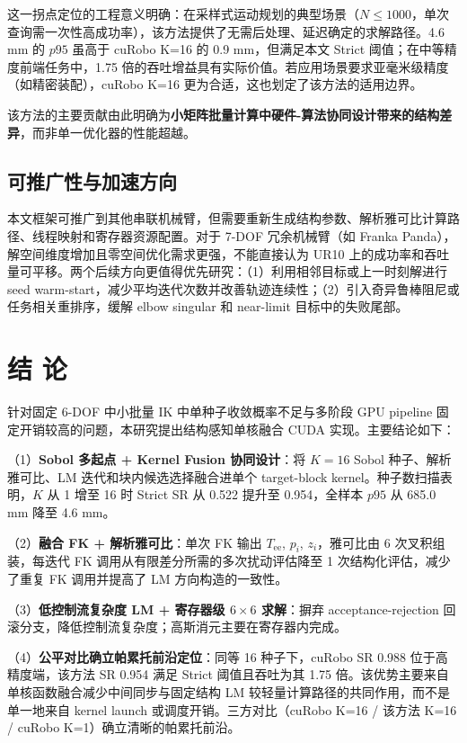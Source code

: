 \documentclass[twocolumn,a4paper,10pt]{ctexart}
\begin{document}
这一拐点定位的工程意义明确：在采样式运动规划的典型场景（$N\le1000$，单次查询需一次性高成功率），该方法提供了无需后处理、延迟确定的求解路径。4.6 mm 的 $p95$ 虽高于 cuRobo K=16 的 0.9 mm，但满足本文 Strict 阈值；在中等精度前端任务中，1.75 倍的吞吐增益具有实际价值。若应用场景要求亚毫米级精度（如精密装配），cuRobo K=16 更为合适，这也划定了该方法的适用边界。

该方法的主要贡献由此明确为\textbf{小矩阵批量计算中硬件-算法协同设计带来的结构差异}，而非单一优化器的性能超越。

\subsection{可推广性与加速方向}

本文框架可推广到其他串联机械臂，但需要重新生成结构参数、解析雅可比计算路径、线程映射和寄存器资源配置。对于 7-DOF 冗余机械臂（如 Franka Panda\cite{moveit}），解空间维度增加且零空间优化需求更强，不能直接认为 UR10 上的成功率和吞吐量可平移。两个后续方向更值得优先研究：（1）利用相邻目标或上一时刻解进行 seed warm-start，减少平均迭代次数并改善轨迹连续性；（2）引入奇异鲁棒阻尼或任务相关重排序，缓解 elbow singular 和 near-limit 目标中的失败尾部。

\FloatBarrier
\section{结 论}

针对固定 6-DOF 中小批量 IK 中单种子收敛概率不足与多阶段 GPU pipeline 固定开销较高的问题，本研究提出结构感知单核融合 CUDA 实现。主要结论如下：

（1）\textbf{Sobol 多起点 + Kernel Fusion 协同设计}：将 $K=16$ Sobol 种子、解析雅可比、LM 迭代和块内候选选择融合进单个 target-block kernel。种子数扫描表明，$K$ 从 1 增至 16 时 Strict SR 从 0.522 提升至 0.954，全样本 $p95$ 从 685.0 mm 降至 4.6 mm。

（2）\textbf{融合 FK + 解析雅可比}：单次 FK 输出 $T_{\mathrm{ee}}$, $p_i$, $z_i$，雅可比由 6 次叉积组装，每迭代 FK 调用从有限差分所需的多次扰动评估降至 1 次结构化评估，减少了重复 FK 调用并提高了 LM 方向构造的一致性。

（3）\textbf{低控制流复杂度 LM + 寄存器级 $6\times6$ 求解}：摒弃 acceptance-rejection 回滚分支，降低控制流复杂度；高斯消元主要在寄存器内完成。

（4）\textbf{公平对比确立帕累托前沿定位}：同等 16 种子下，cuRobo SR 0.988 位于高精度端，该方法 SR 0.954 满足 Strict 阈值且吞吐为其 1.75 倍。该优势主要来自单核函数融合减少中间同步与固定结构 LM 较轻量计算路径的共同作用，而不是单一地来自 kernel launch 或调度开销。三方对比（cuRobo K=16 / 该方法 K=16 / cuRobo K=1）确立清晰的帕累托前沿。
\end{document}
